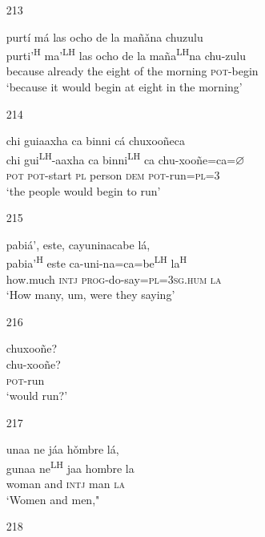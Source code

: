 \begin{itemize}
\item[213]
 
\glll   purt\'{i} m\'{a} las ocho de la ma\~{n}\v{a}na chuzulu\\
purti'\textsuperscript{H} ma'\textsuperscript{LH} las ocho de la ma\~{n}a\textsuperscript{LH}na chu-zulu\\
because already the eight of the morning \textsc{pot}-begin\\
\glt `because it would begin at eight in the morning'
 


\item[214]
 
\glll   chi guiaaxha ca binni c\'{a} chuxoo\~{n}eca\\
chi gui\textsuperscript{LH}-aaxha ca binni\textsuperscript{LH} ca chu-xoo\~{n}e=ca=$\varnothing$\\
\textsc{pot} \textsc{pot}-start \textsc{pl} person \textsc{dem} \textsc{pot}-run=\textsc{pl}=\textsc{3}\\
\glt `the people would begin to run'
 



\item[215]
 
pabi\'{a}', este, cayuninacabe l\'{a},\\
pabia'\textsuperscript{H} este ca-uni-na=ca=be\textsuperscript{LH} la\textsuperscript{H}\\
how.much \textsc{intj} \textsc{prog}-do-say=\textsc{pl}=\textsc{3sg.hum} \textsc{la}\\
\glt `How many, um, were they saying'
 



\item[216]
 
\glll   chuxoo\~{n}e?\\
chu-xoo\~{n}e?\\
\textsc{pot}-run\\
\glt `would run?'
 


\item[217]
 
\glll   unaa ne j\'{a}a h\v{o}mbre l\'{a}, \\
gunaa ne\textsuperscript{LH} jaa hombre la \\
woman and \textsc{intj} man \textsc{la}\\
\glt `Women and men,"
 


\item[218]
 

\end{itemize}
